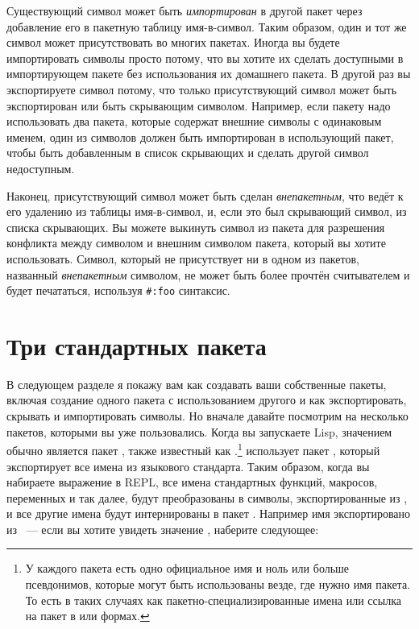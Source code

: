 Существующий символ может быть \textit{импортирован} в другой пакет через добавление его в
пакетную таблицу имя-в-символ.  Таким образом, один и тот же символ может присутствовать
во многих пакетах. Иногда вы будете импортировать символы просто потому, что вы хотите их
сделать доступными в импортирующем пакете без использования их домашнего пакета. В другой
раз вы экспортируете символ потому, что только присутствующий символ может быть
экспортирован или быть скрывающим символом. Например, если пакету надо использовать два
пакета, которые содержат внешние символы с одинаковым именем, один из символов должен быть
импортирован в использующий пакет, чтобы быть добавленным в список скрывающих и сделать
другой символ недоступным.

Наконец, присутствующий символ может быть сделан \textit{внепакетным}, что ведёт к его
удалению из таблицы имя-в-символ, и, если это был скрывающий символ, из списка скрывающих.
Вы можете выкинуть символ из пакета для разрешения конфликта между символом и внешним
символом пакета, который вы хотите использовать. Символ, который не присутствует ни в
одном из пакетов, названный \textit{внепакетным} символом, не может быть более прочтён
считывателем и будет печататься, используя \lstinline!#:foo! синтаксис.

\section{Три стандартных пакета}
 
В следующем разделе я покажу вам как создавать ваши собственные пакеты, включая создание
одного пакета с использованием другого и как экспортировать, скрывать и импортировать
символы. Но вначале давайте посмотрим на несколько пакетов, которыми вы уже
пользовались. Когда вы запускаете Lisp, значением  обычно является пакет
, также известный как .\footnote{У каждого пакета
  есть одно официальное имя и ноль или больше псевдонимов, которые могут быть использованы
  везде, где нужно имя пакета. То есть в таких случаях как пакетно-специализированные
  имена или ссылка на пакет в  или  формах.}
 использует пакет , который экспортирует все имена из
языкового стандарта. Таким образом, когда вы набираете выражение в REPL, все имена
стандартных функций, макросов, переменных и так далее, будут преобразованы в символы,
экспортированные из , и все другие имена будут интернированы в пакет
. Например имя  экспортировано из
~--- если вы хотите увидеть значение , наберите
следующее:

